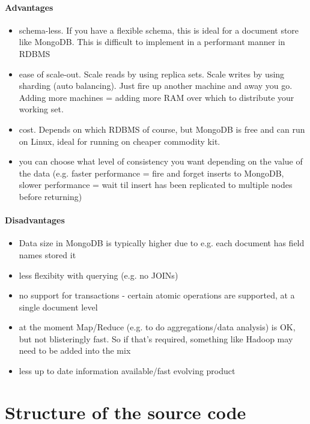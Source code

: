 \documentclass[a4paper, hidelinks, 12pt]{report}
\begin{document}
\subsubsection{Advantages}

\begin{itemize}
\item{} schema-less. If you have a flexible schema, this is ideal for a document store like MongoDB. This is difficult to implement in a performant manner in RDBMS
\item{} ease of scale-out. Scale reads by using replica sets. Scale writes by using sharding (auto balancing). Just fire up another machine and away you go. Adding more machines = adding more RAM over which to distribute your working set.
\item{} cost. Depends on which RDBMS of course, but MongoDB is free and can run on Linux, ideal for running on cheaper commodity kit.
\item{} you can choose what level of consistency you want depending on the value of the data (e.g. faster performance = fire and forget inserts to MongoDB, slower performance = wait til insert has been replicated to multiple nodes before returning)

\end{itemize}
\subsubsection{Disadvantages}

\begin{itemize}
\item{} Data size in MongoDB is typically higher due to e.g. each document has field names stored it
\item{} less flexibity with querying (e.g. no JOINs)
\item{} no support for transactions - certain atomic operations are supported, at a single document level
\item{} at the moment Map/Reduce (e.g. to do aggregations/data analysis) is OK, but not blisteringly fast. So if that's required, something like Hadoop may need to be added into the mix
\item{} less up to date information available/fast evolving product

\end{itemize}


\chapter{Structure of the source code}
\end{document}

